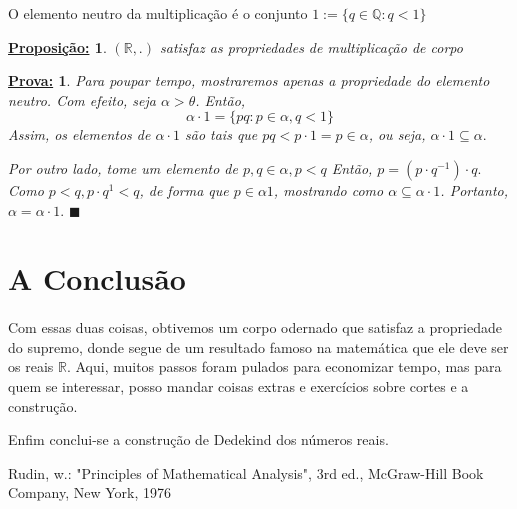\documentclass{article}
\newtheorem*{proposition*}{\underline{Proposi\c c\~ao:}}
\newtheorem*{proof*}{\underline{Prova:}}
\renewcommand\qedsymbol{$\blacksquare$}
\begin{document}
O elemento neutro da multiplica\c c\~ao \'e o conjunto $\mathfrak{1}:=\{q\in\mathbb{Q}: q < 1\}$

\begin{proposition*}
$(\mathbb{R}, .)$ satisfaz as propriedades de multiplica\c c\~ao de corpo
\end{proposition*}
\begin{proof*}
Para poupar tempo, mostraremos apenas a propriedade do elemento neutro. Com efeito, seja $\alpha > \theta$. Ent\~ao, 
$$
\alpha\cdot\mathfrak{1}=\{pq: p\in\alpha, q < 1\}
$$
Assim, os elementos de $\alpha\cdot\mathfrak{1}$ s\~ao tais que $pq < p\cdot{1} = p\in\alpha$, ou seja, $\alpha\cdot\mathfrak{1}\subseteq\alpha.$

Por outro lado, tome um elemento de $p, q\in\alpha, p < q$ Ent\~ao, $p = (p \cdot q^{-1}) \cdot q.$ Como $p < q, p\cdot{q^{1}} < q$, de forma que $p\in\alpha\mathfrak{1}$, mostrando como $\alpha\subseteq\alpha\cdot\mathfrak{1}$. Portanto, $\alpha = \alpha\cdot\mathfrak{1}.$
\qedsymbol
\end{proof*}

\section{A Conclus\~ao}

\paragraph{}Com essas duas coisas, obtivemos um corpo odernado que satisfaz a propriedade do supremo, donde segue de um resultado famoso na matem\'atica que ele deve ser os reais $\mathbb{R}.$ Aqui, muitos passos foram pulados para economizar tempo, mas para quem se interessar, posso mandar coisas extras e exerc\'icios sobre cortes e a constru\c c\~ao.

Enfim conclui-se a constru\c c\~ao de Dedekind dos n\'umeros reais.
\begin{thebibliography}{9}
Rudin, w.: "Principles of Mathematical Analysis", 3rd ed., McGraw-Hill Book Company, New York, 1976
\end{thebibliography}
\end{document}
